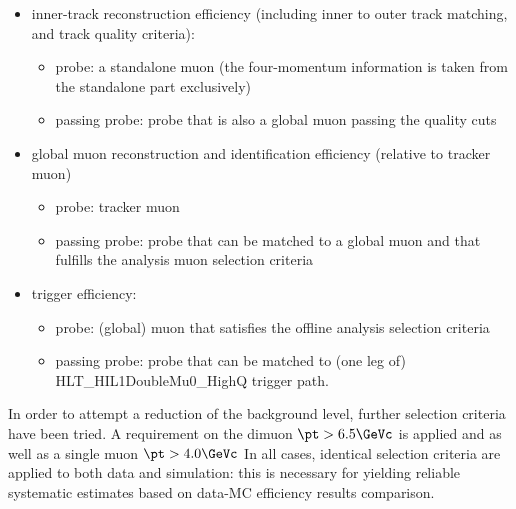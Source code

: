 \begin{itemize}
\item inner-track reconstruction efficiency (including inner to
  outer track matching, and track quality criteria): %
  \begin{itemize}
  \item probe: a standalone muon (the four-momentum information is taken from the
    standalone part exclusively)
  \item passing probe: probe that is also a global muon passing the quality cuts
  \end{itemize}
\item global muon reconstruction and identification efficiency (relative to tracker muon)
  \begin{itemize}
  \item probe: tracker muon %
  \item passing probe: probe that can be matched to a global muon and that fulfills the analysis muon selection criteria
  \end{itemize}
\item trigger efficiency:
  \begin{itemize}
  \item probe: (global) muon that satisfies the offline analysis selection criteria
    \item passing probe: probe that can be matched to (one leg of) HLT\_HIL1DoubleMu0\_HighQ trigger path.
  \end{itemize}
\end{itemize}

In order to attempt a reduction of the background level, further selection criteria have been tried. 
A requirement on the dimuon $\pt > 6.5 \GeVc$ is applied and as well as a single muon  $\pt > 4.0 \GeVc$
In all cases, identical selection criteria are applied to both data and simulation: this is necessary for yielding reliable systematic estimates based on data-MC efficiency results comparison. 

